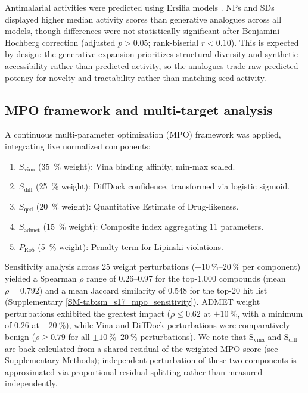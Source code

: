 \documentclass[journal=jcisd8,manuscript=article]{achemso}
\begin{document}
Antimalarial activities were predicted using Ersilia models \cite{Turon2025}. NPs and SDs displayed higher median activity scores than generative analogues
across all models, though differences were not statistically significant after Benjamini--Hochberg correction (adjusted $p > \num{0.05}$; rank-biserial $r <
\num{0.10}$). This is expected by design: the generative expansion prioritizes structural diversity and synthetic accessibility rather than predicted activity,
so the analogues trade raw predicted potency for novelty and tractability rather than matching seed activity.

\subsection{MPO framework and multi-target analysis}
\label{sec:mpo-tiering}

A continuous multi-parameter optimization (MPO) framework was applied, integrating five normalized components:
\begin{enumerate}
    \item $S_{\text{vina}}$ (\qty{35}{\percent} weight): Vina binding affinity, min-max scaled.
    \item $S_{\text{diff}}$ (\qty{25}{\percent} weight): DiffDock confidence, transformed via logistic sigmoid.
    \item $S_{\text{qed}}$ (\qty{20}{\percent} weight): Quantitative Estimate of Drug-likeness.
    \item $S_{\text{admet}}$ (\qty{15}{\percent} weight): Composite index aggregating \num{11} parameters.
    \item $P_{\text{Ro5}}$ (\qty{5}{\percent} weight): Penalty term for Lipinski violations.
\end{enumerate}
Sensitivity analysis across \num{25} weight perturbations ($\pm \qtyrange{10}{20}{\percent}$ per component) yielded a Spearman $\rho$ range of
\numrange{0.26}{0.97} for the top-1,000 compounds (mean $\rho = \num{0.792}$) and a mean Jaccard similarity of \num{0.548} for the top-20 hit list
(Supplementary \cref{SM-tab:sm_s17_mpo_sensitivity}). ADMET weight perturbations exhibited the greatest impact ($\rho \leq \num{0.62}$ at $\pm\qty{10}{\percent}$, with a minimum of $\num{0.26}$ at $\qty{-20}{\percent}$), while Vina and DiffDock perturbations were comparatively benign ($\rho \geq \num{0.79}$ for all $\pm\qtyrange{10}{20}{\percent}$ perturbations). We note that S$_{\text{vina}}$ and S$_{\text{diff}}$
are back-calculated from a shared residual of the weighted MPO score (see \hyperref[SM-sec:mpo_sensitivity_methods]{Supplementary Methods}); independent
perturbation of these two components is approximated via proportional residual splitting rather than measured independently.
\end{document}
